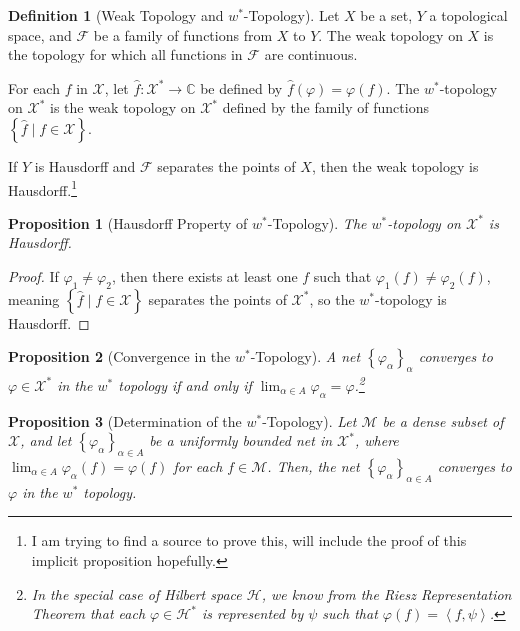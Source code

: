 \documentclass[12pt]{extarticle}
\newcommand{\C}{\mathbb{C}}
\newcommand{\iprod}[2]{\left\langle #1,#2\right\rangle}
\newcommand{\set}[1]{\left\{#1\right\}}
\theoremstyle{plain}
\newtheorem*{proposition}{Proposition}
\theoremstyle{definition}
\newtheorem*{definition}{Definition}
\theoremstyle{note}
\renewcommand{\newline}{\hfill\break}
\begin{document}
\begin{definition}[Weak Topology and $w^{\ast}$-Topology]
Let $X$ be a set, $Y$ a topological space, and $\mathcal{F}$ be a family of functions from $X$ to $Y$. The weak topology on $X$ is the topology for which all functions in $\mathcal{F}$ are continuous.\newline

For each $f$ in $\mathcal{X}$, let $\hat{f}: \mathcal{X}^{\ast}\rightarrow \C$ be defined by $\hat{f}(\varphi) = \varphi(f)$. The $w^{\ast}$-topology on $\mathcal{X}^{\ast}$ is the weak topology on $\mathcal{X}^{\ast}$ defined by the family of functions $\set{\hat{f}\mid f\in \mathcal{X}}$.\newline

If $Y$ is Hausdorff and $\mathcal{F}$ separates the points of $X$, then the weak topology is Hausdorff.\footnote{I am trying to find a source to prove this, will include the proof of this implicit proposition hopefully.}
\end{definition}
\begin{proposition}[Hausdorff Property of $w^{\ast}$-Topology]
  The $w^{\ast}$-topology on $\mathcal{X}^{\ast}$ is Hausdorff.
\end{proposition}
\begin{proof}
  If $\varphi_1 \neq \varphi_2$, then there exists at least one $f$ such that $\varphi_1(f) \neq \varphi_2(f)$, meaning $\set{\hat{f}\mid f\in \mathcal{X}}$ separates the points of $\mathcal{X}^{\ast}$, so the $w^{\ast}$-topology is Hausdorff.
\end{proof}
\begin{proposition}[Convergence in the $w^{\ast}$-Topology]
  A net $\set{\varphi_{\alpha}}_{\alpha}$ converges to $\varphi\in\mathcal{X}^{\ast}$ in the $w^{\ast}$ topology if and only if $\lim_{\alpha \in A}\varphi_{\alpha} = \varphi$.\footnote{In the special case of Hilbert space $\mathcal{H}$, we know from the Riesz Representation Theorem that each $\varphi\in \mathcal{H}^{\ast}$ is represented by $\psi$ such that $\varphi(f) = \iprod{f}{\psi}$.}
\end{proposition}
\begin{proposition}[Determination of the $w^{\ast}$-Topology]
  Let $\mathcal{M}$ be a dense subset of $\mathcal{X}$, and let $\set{\varphi_{\alpha}}_{\alpha\in A}$ be a uniformly bounded net in $\mathcal{X}^{\ast}$, where $\lim_{\alpha \in A}\varphi_{\alpha}(f) = \varphi(f)$ for each $f\in \mathcal{M}$. Then, the net $\set{\varphi_{\alpha}}_{\alpha \in A}$ converges to $\varphi$ in the $w^{\ast}$ topology.
\end{proposition}
\end{document}
